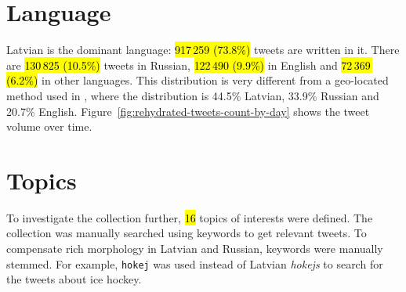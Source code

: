 \documentclass{IOS-Book-Article}
\makeatletter
\newcommand{\sn}[1]{\href{https://twitter.com/#1}{\texttt{@#1}}}
\makeatother
\begin{document}
\section{Language}
\label{sec:language}



Latvian is the dominant language: \hl{917\,259 (73.8\%)} tweets are written in it.\footnotemark{} There are \hl{130\,825 (10.5\%)} tweets in Russian, \hl{122\,490 (9.9\%)} in English and \hl{72\,369\, (6.2\%)} in other languages. This distribution is very different from a geo-located method used in \cite{milajevs:2017:BUCC}, where the distribution is 44.5\% Latvian, 33.9\% Russian and 20.7\% English. Figure~\ref{fig:rehydrated-tweets-count-by-day} shows the tweet volume over time.


%
%
%



\section{Topics}
\label{sec:topics}

To investigate the collection further, \hl{16} topics of interests were defined. The collection was manually searched using keywords to get relevant tweets. To compensate rich morphology in Latvian and Russian, keywords were manually stemmed. For example, \texttt{hokej} was used instead of Latvian \textit{hokejs} to search for the tweets about ice hockey. 
\end{document}
